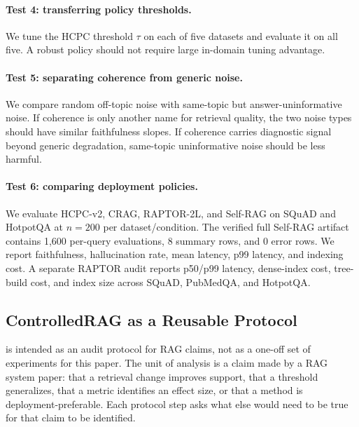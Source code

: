 \paragraph{Test 4: transferring policy thresholds.}
We tune the HCPC threshold $\tau$ on each of five datasets and evaluate it on
all five. A robust policy should not require large in-domain tuning advantage.

\paragraph{Test 5: separating coherence from generic noise.}
We compare random off-topic noise with same-topic but answer-uninformative
noise. If coherence is only another name for retrieval quality, the two noise
types should have similar faithfulness slopes. If coherence carries diagnostic
signal beyond generic degradation, same-topic uninformative noise should be
less harmful.

\paragraph{Test 6: comparing deployment policies.}
We evaluate HCPC-v2, CRAG, RAPTOR-2L, and Self-RAG on SQuAD and HotpotQA at
$n=200$ per dataset/condition. The verified full Self-RAG artifact contains
1,600 per-query evaluations, 8 summary rows, and 0 error rows. We report
faithfulness, hallucination rate, mean latency, p99 latency, and indexing
cost. A separate RAPTOR audit reports p50/p99 latency, dense-index cost,
tree-build cost, and index size across SQuAD, PubMedQA, and HotpotQA.

\subsection{ControlledRAG as a Reusable Protocol}

\method{} is intended as an audit protocol for RAG claims, not as a one-off
set of experiments for this paper. The unit of analysis is a claim made by a
RAG system paper: that a retrieval change improves support, that a threshold
generalizes, that a metric identifies an effect size, or that a method is
deployment-preferable. Each protocol step asks what else would need to be true
for that claim to be identified.

